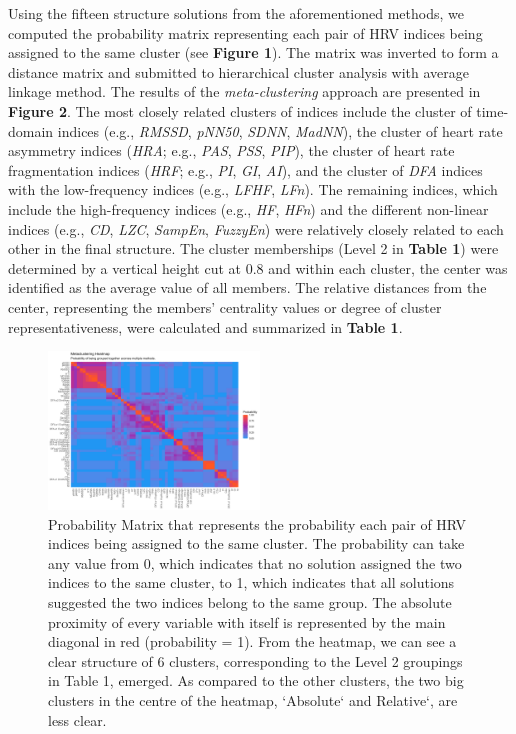 \documentclass[
  english,
  jou,floatsintext]{apa6}
\begin{document}
Using the fifteen structure solutions from the aforementioned methods, we computed the probability matrix representing each pair of HRV indices being assigned to the same cluster (see \textbf{Figure 1}). The matrix was inverted to form a distance matrix and submitted to hierarchical cluster analysis with average linkage method. The results of the \emph{meta-clustering} approach are presented in \textbf{Figure 2}. The most closely related clusters of indices include the cluster of time-domain indices (e.g., \emph{RMSSD}, \emph{pNN50}, \emph{SDNN}, \emph{MadNN}), the cluster of heart rate asymmetry indices (\emph{HRA}; e.g., \emph{PAS}, \emph{PSS}, \emph{PIP}), the cluster of heart rate fragmentation indices (\emph{HRF}; e.g., \emph{PI}, \emph{GI}, \emph{AI}), and the cluster of \emph{DFA} indices with the low-frequency indices (e.g., \emph{LFHF}, \emph{LFn}). The remaining indices, which include the high-frequency indices (e.g., \emph{HF}, \emph{HFn}) and the different non-linear indices (e.g., \emph{CD}, \emph{LZC}, \emph{SampEn}, \emph{FuzzyEn}) were relatively closely related to each other in the final structure. The cluster memberships (Level 2 in \textbf{Table 1}) were determined by a vertical height cut at 0.8 and within each cluster, the center was identified as the average value of all members. The relative distances from the center, representing the members' centrality values or degree of cluster representativeness, were calculated and summarized in \textbf{Table 1}.

\begin{figure}
\includegraphics[width=0.50\textwidth]{figures/figure_probability_matrix} \caption{Probability Matrix that represents the probability each pair of HRV indices being assigned to the same cluster. The probability can take any value from 0, which indicates that no solution assigned the two indices to the same cluster, to 1, which indicates that all solutions suggested the two indices belong to the same group. The absolute proximity of every variable with itself is represented by the main diagonal in red (probability = 1). From the heatmap, we can see a clear structure of 6 clusters, corresponding to the Level 2 groupings in Table 1, emerged. As compared to the other clusters, the two big clusters in the centre of the heatmap, `Absolute` and Relative`, are less clear.}\label{fig:Figure1}
\end{figure}
\end{document}
